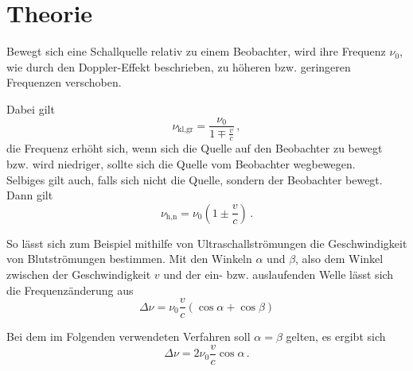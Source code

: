 \section{Theorie}
\label{sec:theorie}

Bewegt sich eine Schallquelle relativ zu einem
Beobachter, wird ihre Frequenz $\nu_0$, wie durch den
Doppler-Effekt beschrieben, zu höheren bzw.
geringeren Frequenzen verschoben.

Dabei gilt
\begin{equation}
    \nu_{\text{kl},\text{gr}} = \frac{\nu_0}
    {1 \mp \frac{v}{c}} \,,
    \label{eq:doppler1}
\end{equation}
die Frequenz erhöht sich, wenn sich die 
Quelle auf den Beobachter zu bewegt bzw.
wird niedriger, sollte sich die Quelle vom
Beobachter wegbewegen. \\

Selbiges gilt auch, falls sich nicht die Quelle, 
sondern der Beobachter bewegt.
Dann gilt
\begin{equation}
    \nu_{\text{h},\text{n}} = \nu_0 \left(1 \pm \frac{v}{c} \right) \,.
    \label{eq:doppler2}
\end{equation}

So lässt sich zum Beispiel mithilfe von Ultraschallströmungen
die Geschwindigkeit von Blutströmungen bestimmen.
Mit den Winkeln $\alpha$ und $\beta$, also dem Winkel zwischen der
Geschwindigkeit $v$ und der ein- bzw. auslaufenden Welle lässt sich
die Frequenzänderung aus
\begin{equation*}
    \Delta \nu = \nu_0 \frac{v}{c} (\cos \alpha + \cos \beta)
\end{equation*}

Bei dem im Folgenden verwendeten Verfahren soll 
$\alpha = \beta$ gelten, es ergibt sich
\begin{equation}
    \Delta \nu = 2 \nu_0 \frac{v}{c} \cos \alpha \,.
    \label{eq:dopplerversch}
\end{equation}